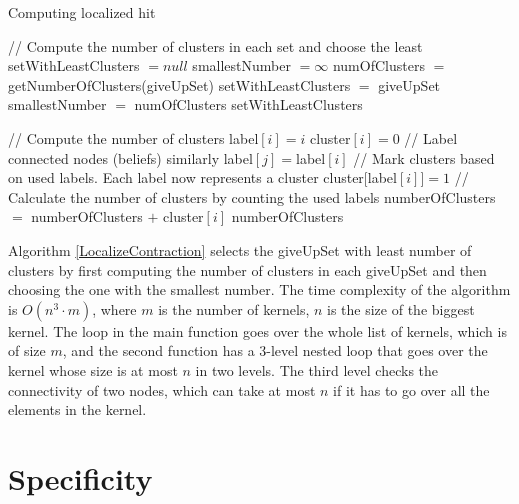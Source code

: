 \begin{algorithm}
\caption{Computing localized hit}
\label{LocalizeContraction}
\begin{algorithmic}[1]
\State // Compute the number of clusters in each set and choose the least
\State setWithLeastClusters $= null$
\State smallestNumber $= \infty$
\State numOfClusters $=$ getNumberOfClusters(giveUpSet)
\State setWithLeastClusters $=$ giveUpSet
\State smallestNumber $=$ numOfClusters
\EndIf
\EndFor
\State \Return setWithLeastClusters
\EndFunction
\end{algorithmic}


\begin{algorithmic}[1]
\State // Compute the number of clusters
\State label$[i]=i$
\EndFor
{}
\State cluster$[i]=0$
\EndFor
\State // Label connected nodes (beliefs) similarly
\State label$[j] = $label$[i]$
\EndIf
\EndFor
\EndFor
\State // Mark clusters based on used labels. Each label now represents a cluster
\State cluster$[$label$[i]]=1$
\EndFor
\State // Calculate the number of clusters by counting the used labels
\State numberOfClusters $=$ numberOfClusters $+$ cluster$[i]$
\EndFor 
\State \Return numberOfClusters
\EndFunction
\end{algorithmic}
\end{algorithm}

Algorithm \ref{LocalizeContraction} selects the giveUpSet with least number of clusters by first computing the number of clusters in each giveUpSet and then choosing the one with the smallest number. The time complexity of the algorithm is $O(n^3 \cdot m)$, where $m$ is the number of kernels, $n$ is the size of the biggest kernel. The loop in the main function goes over the whole list of kernels, which is of size $m$, and the second function has a 3-level nested loop that goes over the kernel whose size is at most $n$ in two levels. The third level checks the connectivity of two nodes, which can take at most $n$ if it has to go over all the elements in the kernel.

\section{Specificity}

